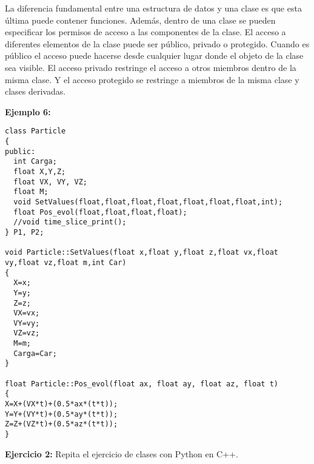 \documentclass[10.5pt]{article}
\begin{document}
La diferencia fundamental entre una estructura de datos y una clase es que esta última puede contener funciones. Además, dentro de una clase se pueden especificar los permisos de acceso a las componentes de la clase. El acceso a diferentes elementos de la clase puede ser público, privado o protegido. Cuando es público el acceso puede hacerse desde cualquier lugar donde el objeto de la clase sea visible. El acceso privado restringe el acceso a otros miembros dentro de la misma clase. Y el acceso protegido se restringe a miembros de la misma clase y clases derivadas.

{\bf Ejemplo 6:}
\begin{verbatim}
class Particle
{
public:
  int Carga;
  float X,Y,Z;
  float VX, VY, VZ;
  float M;
  void SetValues(float,float,float,float,float,float,float,int);
  float Pos_evol(float,float,float,float);
  //void time_slice_print();
} P1, P2;

void Particle::SetValues(float x,float y,float z,float vx,float vy,float vz,float m,int Car)
{
  X=x;
  Y=y;
  Z=z;
  VX=vx;
  VY=vy;
  VZ=vz;
  M=m;
  Carga=Car;
}

float Particle::Pos_evol(float ax, float ay, float az, float t)
{
X=X+(VX*t)+(0.5*ax*(t*t));
Y=Y+(VY*t)+(0.5*ay*(t*t));
Z=Z+(VZ*t)+(0.5*az*(t*t));
}
\end{verbatim}

{\bf Ejercicio 2:} Repita el ejercicio de clases con Python en C++.





%
\end{document}
